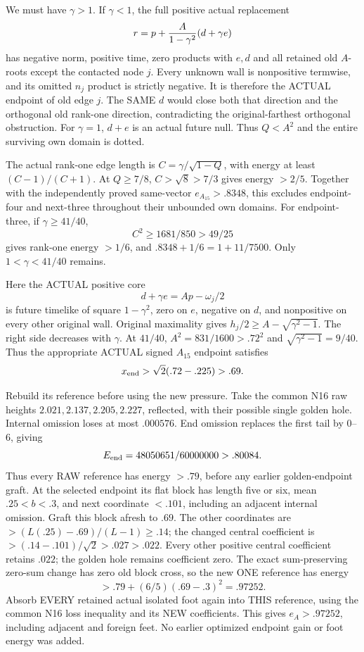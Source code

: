 \documentclass[11pt]{article}
\begin{document}
We must have \(\gamma>1\).
If \(\gamma<1\), the full positive actual replacement
\[
                 r=p+{A\over1-\gamma^2}(d+\gamma e)
\]
has negative norm, positive time, zero products with \(e,d\)
and all retained old \(A\)-roots except the contacted node \(j\).
Every unknown wall is nonpositive termwise, and its omitted
\(n_j\) product is strictly negative.
It is therefore the ACTUAL endpoint of old edge \(j\).
The SAME \(d\) would close both that direction and the
orthogonal old rank-one direction, contradicting the
original-farthest orthogonal obstruction.
For \(\gamma=1\), \(d+e\) is an actual future null.
Thus \(Q<A^2\) and the entire surviving own domain is dotted.

The actual rank-one edge length is
\(C=\gamma/\sqrt{1-Q}\), with energy at least \((C-1)/(C+1)\).
At \(Q\ge7/8\), \(C>\sqrt8>7/3\) gives energy \(>2/5\).
Together with the independently proved same-vector
\(e_{A_{15}}>.8348\), this excludes endpoint-four and
next-three throughout their unbounded own domains.
For endpoint-three, if \(\gamma\ge41/40\),
\[
                  C^2\ge1681/850>49/25
\]
gives rank-one energy \(>1/6\), and
\(.8348+1/6=1+11/7500\).
Only \(1<\gamma<41/40\) remains.

Here the ACTUAL positive core
\[
                  d+\gamma e=Ap-\omega_j/2
\]
is future timelike of square \(1-\gamma^2\), zero on \(e\),
negative on \(d\), and nonpositive on every other original wall.
Original maximality gives
\(h_j/2\ge A-\sqrt{\gamma^2-1}\).
The right side decreases with \(\gamma\).
At \(41/40\), \(A^2=831/1600>.72^2\) and
\(\sqrt{\gamma^2-1}=9/40\).
Thus the appropriate ACTUAL signed \(A_{15}\) endpoint satisfies
\[
                         x_{\rm end}>\sqrt2(.72-.225)>.69 .
\]

Rebuild its reference before using the new pressure.
Take the common N16 raw heights
\(2.021,2.137,2.205,2.227\), reflected,
with their possible single golden hole.
Internal omission loses at most \(.000576\).
End omission replaces the first tail by \(0\)--\(6\), giving
\[
                         E_{\rm end}=48050651/60000000>.80084 .
\]
Thus every RAW reference has energy \(>.79\), before any
earlier golden-endpoint graft.
At the selected endpoint its flat block has length five or six,
mean \(.25<b<.3\), and next coordinate \(<.101\), including
an adjacent internal omission.
Graft this block afresh to \(.69\).
The other coordinates are \(>(L(.25)-.69)/(L-1)\ge.14\);
the changed central coefficient is
\(>(.14-.101)/\sqrt2>.027>.022\).
Every other positive central coefficient retains \(.022\);
the golden hole remains coefficient zero.
The exact sum-preserving zero-sum change has zero old block cross,
so the new ONE reference has energy
\[
                    >.79+(6/5)(.69-.3)^2=.97252 .
\]
Absorb EVERY retained actual isolated foot again into THIS
reference, using the common N16 loss inequality and its NEW
coefficients.
This gives \(e_A>.97252\), including adjacent and foreign feet.
No earlier optimized endpoint gain or foot energy was added.
\end{document}
